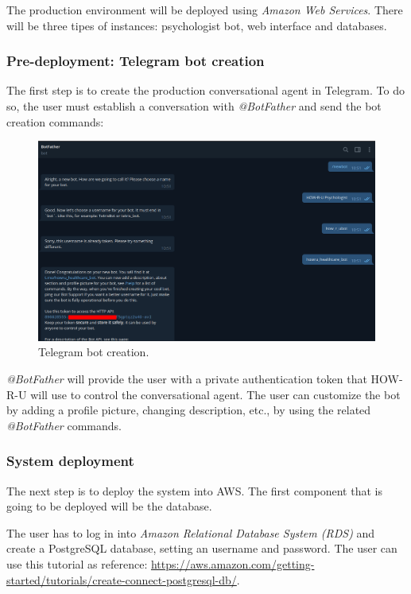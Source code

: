 \documentclass[12pt,english]{article}
\begin{document}
The production environment will be deployed using \emph{Amazon Web Services}. There will be three tipes of instances: psychologist bot, web interface and databases.

\subsubsection{Pre-deployment: Telegram bot creation}

The first step is to create the production conversational agent in Telegram. To do so, the user must establish a conversation with \emph{@BotFather} and send the bot creation commands:

\begin{figure}[H]
  \centering
  \includegraphics[width=\textwidth]{bot_creation.png}
  \caption{Telegram bot creation.}
\end{figure}

\emph{@BotFather} will provide the user with a private authentication token that HOW-R-U will use to control the conversational agent. The user can customize the bot by adding a profile picture, changing description, etc., by using the related \emph{@BotFather} commands.

\subsubsection{System deployment}

The next step is to deploy the system into AWS. The first component that is going to be deployed will be the database.

The user has to log in into \emph{Amazon Relational Database System (RDS)} and create a PostgreSQL database, setting an username and password. The user can use this tutorial as reference: \href{https://aws.amazon.com/getting-started/tutorials/create-connect-postgresql-db/}{https://aws.amazon.com/getting-started/tutorials/create-connect-postgresql-db/}.
\end{document}
